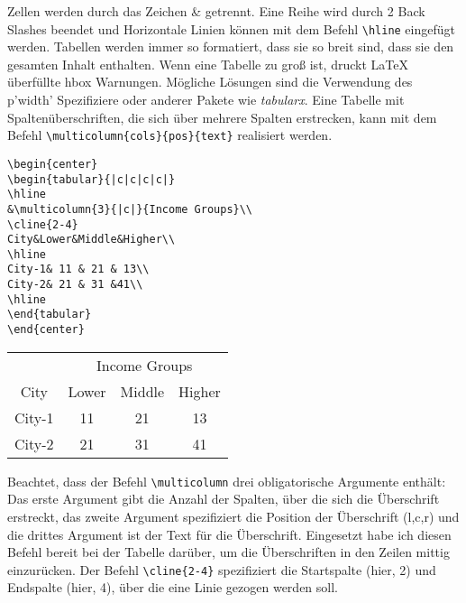 Zellen werden durch das Zeichen \& getrennt. Eine Reihe wird durch 2 Back Slashes beendet und Horizontale Linien können mit dem Befehl \verb|\hline| eingefügt werden.
Tabellen werden immer so formatiert, dass sie so breit sind, dass sie den gesamten Inhalt enthalten. Wenn eine Tabelle zu groß ist, druckt LaTeX überfüllte hbox Warnungen. Mögliche Lösungen sind die Verwendung des p{'width'} Spezifiziere oder anderer Pakete wie \emph{tabularx}. Eine Tabelle mit Spaltenüberschriften, die sich über mehrere Spalten erstrecken, kann mit dem Befehl \verb|\multicolumn{cols}{pos}{text}| realisiert werden.

\begin{lstlisting}[style=LaTeX,caption={Einfache Tabelle mit Multicolumn},label=lst:tab2]
\begin{center}
\begin{tabular}{|c|c|c|c|}
\hline
&\multicolumn{3}{|c|}{Income Groups}\\
\cline{2-4}
City&Lower&Middle&Higher\\
\hline
City-1& 11 & 21 & 13\\
City-2& 21 & 31 &41\\
\hline
\end{tabular}
\end{center}
\end{lstlisting}

\begin{center}
	\begin{tabular}{|c|c|c|c|}
		\hline
		&\multicolumn{3}{|c|}{Income Groups}\\
		\cline{2-4}
		City&Lower&Middle&Higher\\
		\hline
		City-1& 11 & 21 & 13\\
		City-2& 21 & 31 &41\\
		\hline
	\end{tabular}
\end{center}
\bigskip

Beachtet, dass der Befehl \verb|\multicolumn| drei obligatorische Argumente enthält: Das erste Argument gibt die Anzahl der Spalten, über die sich die Überschrift erstreckt, das zweite Argument spezifiziert die Position der Überschrift (l,c,r) und die drittes Argument ist der Text für die Überschrift. Eingesetzt habe ich diesen Befehl bereit bei der Tabelle darüber, um die Überschriften in den Zeilen mittig einzurücken. Der Befehl \verb|\cline{2-4}| spezifiziert die Startspalte (hier, 2) und Endspalte (hier, 4), über die eine Linie gezogen werden soll.


